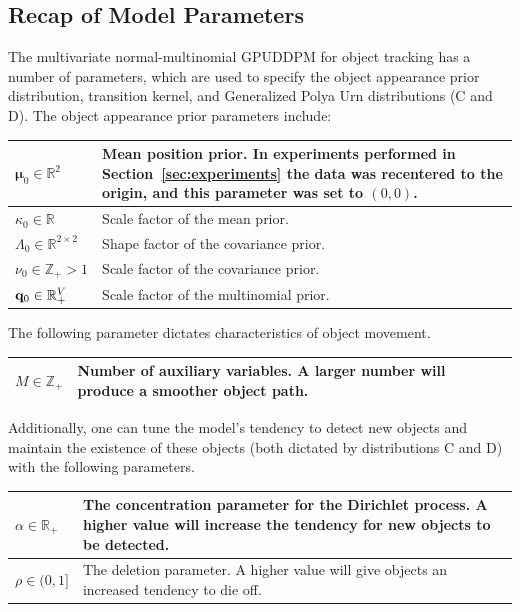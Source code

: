 \documentclass[twocolumn, final]{svjour3}
\begin{document}
\subsection{Recap of Model Parameters}
\label{sec:recapofparameters}

The multivariate normal-multinomial GPUDDPM for object tracking has a number of parameters, which are used to specify the object appearance prior distribution, transition kernel, and Generalized Polya Urn distributions (C and D). %
The object appearance prior parameters include:
\begin{center}
\begin{tabular}[c]{| p{2cm} |  p{5.5cm} | }
\hline
$\boldsymbol{\mu}_{0} \in \mathbb{R}^{2}$  &  Mean position prior. In experiments performed in Section~\ref{sec:experiments} the data was recentered to the origin, and this parameter was set to $(0,0)$. \\ \hline
$\kappa_{0} \in \mathbb{R}$  &  Scale factor of the mean prior.\\ \hline
$\Lambda_{0} \in \mathbb{R}^{2 \times 2}$  &  Shape factor of the covariance prior.\\ \hline
$\nu_{0} \in \mathbb{Z}_{+} > 1$  &  Scale factor of the covariance prior.\\ \hline
$\bold{q}_{0} \in \mathbb{R}_{+}^{V}$  &  Scale factor of the multinomial prior. \\
\hline
\end{tabular}
\end{center} \vspace{3mm}
The following parameter dictates characteristics of object movement.
\begin{center}
\begin{tabular}[c]{ | p{2cm} | p{5.5cm} | }
\hline
$M \in \mathbb{Z}_{+}$  &  Number of auxiliary variables. A larger number will produce a smoother object path.\\
\hline
\end{tabular}
\end{center} \vspace{3mm}
Additionally, one can tune the model's tendency to detect new objects and maintain the existence of these objects (both dictated by distributions C and D) with the following parameters.
\begin{center}
\begin{tabular}[c]{ | p{2cm} | p{5.5cm} | }
\hline
$\alpha \in \mathbb{R}_{+}$  &  The concentration parameter for the Dirichlet process. A higher value will increase the tendency for new objects to be detected.\\ \hline
$\rho \in ( 0, 1 ]$  &  The deletion parameter. A higher value will give objects an increased tendency to die off. \\
\hline
\end{tabular}
\end{center}
\end{document}
